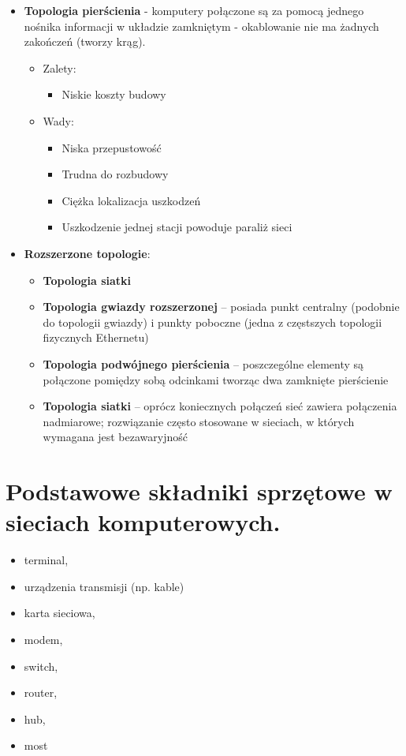\documentclass[12pt,a4paper]{article}
\begin{document}
\begin{itemize}
		\item \textbf{Topologia pierścienia} - komputery połączone są za pomocą jednego nośnika informacji w układzie zamkniętym - okablowanie nie ma żadnych zakończeń (tworzy krąg).
		\begin{itemize}
			\item Zalety:
			\begin{itemize}
				\item Niskie koszty budowy
			\end{itemize}
			\item Wady:
			\begin{itemize}
				\item Niska przepustowość
				\item Trudna do rozbudowy
				\item Ciężka lokalizacja uszkodzeń
				\item Uszkodzenie jednej stacji powoduje paraliż sieci
			\end{itemize}
		\end{itemize}
		
		\item \textbf{Rozszerzone topologie}:
		\begin{itemize}
			\item \textbf{Topologia siatki}
			\item \textbf{Topologia gwiazdy rozszerzonej} – posiada punkt centralny (podobnie do topologii gwiazdy) i punkty poboczne (jedna z częstszych topologii fizycznych Ethernetu)
			\item \textbf{Topologia podwójnego pierścienia} – poszczególne elementy są połączone pomiędzy sobą odcinkami tworząc dwa zamknięte pierścienie
			\item \textbf{Topologia siatki} – oprócz koniecznych połączeń sieć zawiera połączenia nadmiarowe; rozwiązanie często stosowane w sieciach, w których wymagana jest bezawaryjność
		\end{itemize}
	\end{itemize}

	\section{Podstawowe składniki sprzętowe w sieciach komputerowych.}
	\begin{itemize}
		\item terminal,
		\item urządzenia transmisji (np. kable)
		\item karta sieciowa,
		\item modem,
		\item switch,
		\item router,
		\item hub,
		\item most
	\end{itemize}
\end{document}
